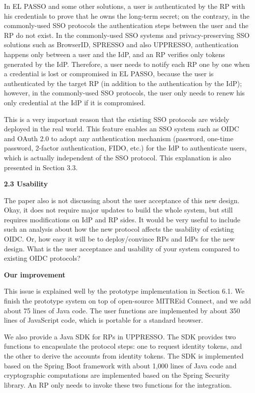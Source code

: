 \documentclass[letterpaper,onecolumn,10pt]{article}
\begin{document}
In EL PASSO and some other solutions,
    a user is authenticated by the RP with his credentials
            to prove that he owns the long-term secret;
            on the contrary,
 in the commonly-used SSO protocols    the authentication steps between the user and the RP do not exist.
In the commonly-used SSO systems and privacy-preserving SSO solutions
    such as BrowserID, SPRESSO and also UPPRESSO,
    authentication happens only between a user and the IdP,
    and an RP verifies only tokens generated by the IdP.
Therefore,
        a user needs to notify each RP one by one when a credential is lost or compromised in EL PASSO,
    because the user is authenticated by the target RP (in addition to the authentication by the IdP);
however, in the commonly-used SSO protocols, the user only needs to renew his only credential at the IdP if it is compromised.

This is a very important reason that the existing SSO protocols are widely deployed in the real world.
This feature enables an SSO system such as OIDC and OAuth 2.0 to adopt any authentication mechanism
 (password, one-time password, 2-factor authentication, FIDO, etc.) for the IdP to authenticate users,
  which is actually independent of the SSO protocol.
This explanation is also presented in Section 3.3.

\noindent\textbf{2.3 Usability}

The paper also is not discussing about the user acceptance of this new design.
Okay, it does not require major updates to build the whole system, but still requires modifications on IdP and RP sides.
It would be very useful to include such an analysis about how the new protocol affects the usability of existing OIDC.
Or, how easy it will be to deploy/convince RPs and IdPs for the new design.
What is the user acceptance and usability of your system compared to existing OIDC protocols?

\vspace{1mm}\noindent\textbf{Our improvement}

This issue is explained well by the prototype implementation in Section 6.1.
We finish the prototype system on top of open-source MITREid Connect,
    and we add about 75 lines of Java code.
The user functions are implemented by about 350 lines of JavaScript code,
    which is portable for a standard browser.

We also provide a Java SDK for RPs in UPPRESSO.
The SDK provides two functions to encapsulate the protocol steps:
one to request identity tokens, and the other to derive the accounts from identity tokens.
 The SDK is implemented based on the Spring Boot framework with about 1,000 lines of Java code
  and cryptographic computations are implemented based on the Spring Security library.
An RP only needs to invoke these two functions for the integration.
\end{document}
